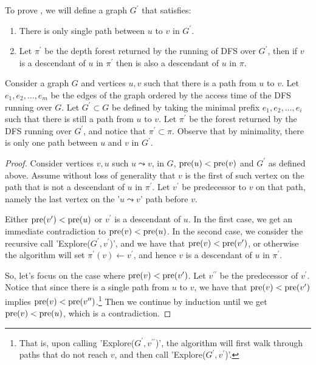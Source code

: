 To prove , we will define a graph $G^{\prime}$ that satisfies:
\begin{enumerate}
  \item There is only single path between $u$ to $v$ in $G^{\prime}$. 
  \item Let $\pi^{\prime}$ be the depth forest returned by the running of DFS over $G^{\prime}$, then if $v$ is a descendant of $u$ in $\pi^{\prime}$ then is also a descendant of $u$ in $\pi$. 
\end{enumerate}

\begin{definition}
Consider a graph $G$ and vertices $u, v$ such that there is a path from $u$ to $v$. Let $e_{1}, e_{2}, \ldots, e_{m}$ be the edges of the graph ordered by the access time of the DFS running over $G$. Let $G^{\prime} \subset G$ be defined by taking the minimal prefix $e_{1}, e_{2}, \ldots, e_{i}$ such that there is still a path from $u$ to $v$. Let $\pi^{\prime}$ be the forest returned by the DFS running over $G^{\prime}$, and notice that $\pi^{\prime} \subset \pi$. Observe that by minimality, there is only one path between $u$ and $v$ in $G^{\prime}$.
\end{definition}


\begin{proof}
  Consider vertices $v,u$ such $u\leadsto v$, in $G$, $\text{pre}(u) < \text{pre}(v)$ and $G^{\prime}$ as defined above. Assume without loss of generality that $v$ is the first of such vertex on the path that is not a descendant of $u$ in $\pi^{\prime}$. Let $v^{\prime}$ be predecessor to $v$ on that path, namely the last vertex on the '$u\leadsto v$' path before $v$.

      
  Either $\text{pre}(v^{\prime}) < \text{pre}(u)$ or $v^{\prime}$ is a descendant of $u$. In the first case, we get an immediate contradiction to $\text{pre}(v) < \text{pre}(u)$. In the second case, we consider the recursive call 'Explore($G^{\prime},v^{\prime}$)', and we have that $\text{pre}(v) < \text{pre}(v^{\prime})$, or otherwise the algorithm will set $\pi^{\prime}(v) \leftarrow v^{\prime}$, and hence $v$ is a descendant of $u$ in $\pi^{\prime}$.

      
So, let's focus on the case where $\text{pre}(v) < \text{pre}(v^{\prime})$. Let $v^{\prime \prime}$ be the predecessor of $v^\prime$. Notice that since there is a single path from $u$ to $v$, we have that $\text{pre}(v) < \text{pre}(v^{\prime})$ implies $\text{pre}(v) < \text{pre}(v^{\prime \prime})$.\footnote{That is, upon calling 'Explore($G^{\prime}, v^{\prime \prime}$)', the algorithm will first walk through paths that do not reach $v$, and then call 'Explore($G^{\prime}, v^{\prime}$)'.} Then we continue by induction until we get $\text{pre}(v) < \text{pre}(u)$, which is a contradiction.

\end{proof}

